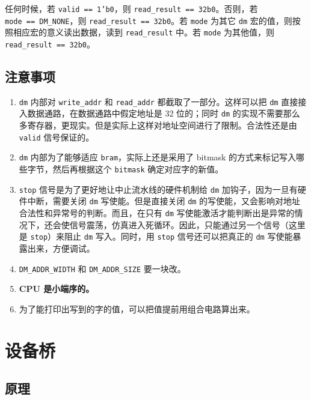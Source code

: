 \documentclass[12pt,AutoFakeBold,AutoFakeSlant]{article}
\providecommand{\tightlist}{%
  \setlength{\itemsep}{0pt}\setlength{\parskip}{0pt}}
\newcommand{\ms}[1]{\texttt{#1}}
\begin{document}
任何时候，若 \texttt{valid\ ==\ 1'b0}，则
\texttt{read\_result\ ==\ 32\textquotesingle{}b0}。否则，若
\texttt{mode\ ==\ DM\_NONE}，则
\texttt{read\_result\ ==\ 32\textquotesingle{}b0}。若 \texttt{mode}
为其它 \texttt{dm} 宏的值，则按照相应宏的意义读出数据，读到
\texttt{read\_result} 中。若 \texttt{mode} 为其他值，则
\texttt{read\_result\ ==\ 32\textquotesingle{}b0}。

\hypertarget{ux6ce8ux610fux4e8bux9879-6}{%
\subsection{注意事项}\label{ux6ce8ux610fux4e8bux9879-6}}

\begin{enumerate}
\def\labelenumi{\arabic{enumi}.}
\tightlist
\item
  \texttt{dm} 内部对 \texttt{write\_addr} 和 \texttt{read\_addr} 都截取了一部分。这样可以把 \texttt{dm} 直接接入数据通路，在数据通路中假定地址是 32 位的；同时 \texttt{dm} 的实现不需要那么多寄存器，更现实。但是实际上这样对地址空间进行了限制。合法性还是由 \ms{valid} 信号保证的。
\item
  \ms{dm} 内部为了能够适应 \ms{bram}，实际上还是采用了 bitmask 的方式来标记写入哪些字节，然后再根据这个 \ms{bitmask} 确定对应字的新值。
\item
  \ms{stop} 信号是为了更好地让中止流水线的硬件机制给 \ms{dm} 加钩子，因为一旦有硬件中断，需要关闭 \ms{dm} 写使能。但是直接关闭 \ms{dm} 的写使能，又会影响对地址合法性和异常号的判断。而且，在只有 \ms{dm} 写使能激活才能判断出是异常的情况下，还会使信号震荡，仿真进入死循环。因此，只能通过另一个信号（这里是 \ms{stop}）来阻止 \ms{dm} 写入。同时，用 \ms{stop} 信号还可以把真正的 \ms{dm} 写使能暴露出来，方便调试。
\item
  \texttt{DM\_ADDR\_WIDTH} 和 \texttt{DM\_ADDR\_SIZE} 要一块改。
\item
  \textbf{CPU 是小端序的。}
\item
  为了能打印出写到的字的值，可以把值提前用组合电路算出来。
\end{enumerate}

\hypertarget{ux8bbeux5907ux6865}{%
\section{设备桥}\label{ux8bbeux5907ux6865}}

\hypertarget{ux539fux7406-8}{%
\subsection{原理}\label{ux539fux7406-8}}
\end{document}
